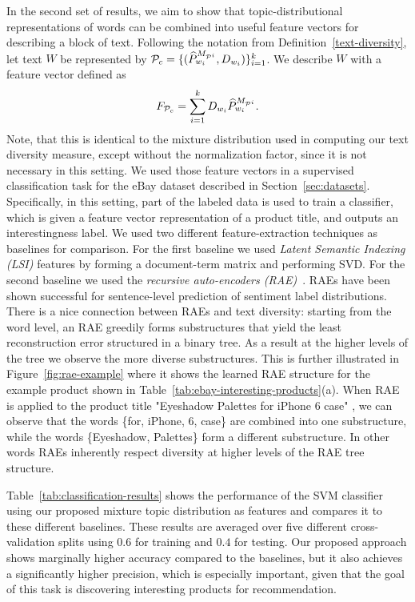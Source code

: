 In the second set of results, we aim to show that topic-distributional
representations of words can be combined into useful feature vectors
for describing a block of text. Following the notation from
Definition~\ref{text-diversity}, let text $W$ be represented by 
${\mathcal P}_c=\{(\widehat{P}^{M_{{\mathcal P}^i}}_{w_i},D_{w_i})\}_{i=1}^k$. We
describe $W$ with a feature vector defined as
\[F_{{\mathcal P}_c}=\sum_{i=1}^k D_{w_i}\widehat{P}^{M_{{\mathcal P}^i}}_{w_i}.\] Note, that this is identical to
the mixture distribution used in computing our text diversity measure, except
without the normalization factor, since it is not necessary in this setting.
We used those feature vectors in a supervised classification
task for the eBay dataset described in
Section~\ref{sec:datasets}. Specifically, in this setting, part of the labeled data
is used to train a classifier, which is given a feature vector
representation of a product title, and outputs an interestingness
label. We used two 
different feature-extraction techniques as baselines for
comparison. For the first baseline we used {\em Latent Semantic
  Indexing (LSI)} features by forming a 
document-term matrix and performing SVD. For the second baseline we used the {\em recursive auto-encoders (RAE)}~\cite{Socher:2011:SRA:2145432.2145450}. RAEs 
have been shown successful for sentence-level prediction of sentiment label
distributions. There is a nice connection between RAEs and text diversity: starting from the word level, an RAE greedily forms substructures that yield the least reconstruction error  structured in a  binary tree. As a result at the higher levels of the tree we observe the more diverse  substructures. This is further illustrated in Figure~\ref{fig:rae-example} where it shows the learned RAE structure for the example product shown in Table~\ref{tab:ebay-interesting-products}(a). When RAE is applied to the product title "Eyeshadow Palettes for iPhone 6 case" , we can observe that the words \{for, iPhone, 6, case\} are combined into one substructure, while the words \{Eyeshadow, Palettes\} form a different substructure. In other words RAEs inherently respect diversity at higher levels of the RAE tree structure.

Table~\ref{tab:classification-results} shows
the performance of the SVM classifier using our proposed mixture topic
distribution as features and compares it to these different baselines.
These results are averaged over five different cross-validation splits using $0.6$ for training
and $0.4$ for testing. Our proposed approach shows marginally higher
accuracy compared to the baselines, but it also achieves a
significantly higher precision, which is especially important, given
that the goal of this task is discovering interesting products for
recommendation.

